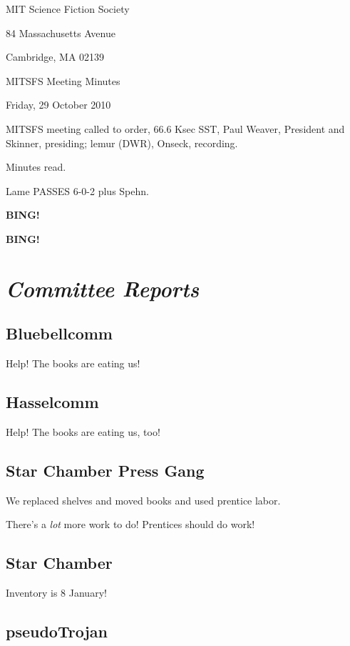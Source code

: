 \documentclass[10pt]{article}
\newcommand{\bing}{{\bf BING!} }
\newcommand{\goto}[1]{\bing \vskip 12pt \section*{{\em{#1}}}}
\newcommand{\ps}{ plus Spehn\xspace}
\newcommand{\skinner}{Paul Weaver, President and Skinner}
\newcommand{\onseck}{lemur (DWR), Onseck}
\newcommand{\meetingdate}{Friday, 29 October 2010}
\begin{document}
\begin{center}

MIT Science Fiction Society

84 Massachusetts Avenue

Cambridge, MA 02139

\vspace{12pt}

MITSFS Meeting Minutes

\meetingdate

\end{center}

\vspace{18pt}

\setlength{\parskip}{6pt}

\noindent
MITSFS meeting called to order, 66.6 Ksec SST,
\skinner, presiding; \onseck, recording.

Minutes read.

Lame PASSES 6-0-2\ps.

\bing

\goto{Committee Reports}

\subsection*{Bluebellcomm}

Help!  The books are eating us!

\subsection*{Hasselcomm}

Help!  The books are eating us, too!

\subsection*{Star Chamber Press Gang}

We replaced shelves and moved books and used prentice labor.

There's a \emph{lot} more work to do!  Prentices should do work!

\subsection*{Star Chamber}

Inventory is 8 January!

\subsection*{pseudoTrojan}
\end{document}
